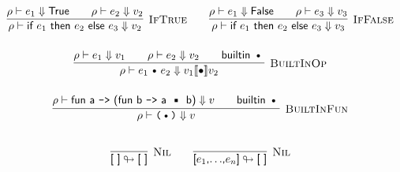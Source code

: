 \documentclass{article}
\def\code#1{\textsf{#1}}
\def\rt{\Downarrow}
\def\binop{\, \text{\textbullet}\, }
\def\envj#1#2#3{#1 \vdash #2 \rt #3}
\def\tsc#1{\textsc{#1}}
\begin{document}
\begin{gather*}
\infer[\tsc{IfTrue}]{\envj \rho {\code{if $e_1$ then $e_2$ else $e_3$}} {v_2}}{\envj \rho {e_1} {\code{True}} && \envj \rho {e_2} {v_2}}\qquad
\infer[\tsc{IfFalse}]{\envj \rho {\code{if $e_1$ then $e_2$ else $e_3$}} {v_3}}{\envj \rho {e_1} {\code{False}} && \envj \rho {e_3} {v_3}}
\\[12pt]
\infer[\tsc{BuiltInOp}]{\envj \rho {e_1 \binop e_2} {v_1\llbracket\bullet \rrbracket v_2}}{\envj \rho {e_1} {v_1} && \envj {\rho} {e_2} {v_2} && \textsf{builtin}\, \binop}\\[12pt]
\infer[\tsc{BuiltInFun}]{\envj \rho {\texttt{($\binop$)}} {v}}{\envj \rho {\code{fun a \texttt{->} (fun b \texttt{->} a $\binop$ b)}} {v} && \textsf{builtin}\, \binop}\\[12pt]
\end{gather*}



\begin{gather*}
\infer[\tsc{Nil}]{\code{[ ]}\looparrowright \code{[ ]}}{}\qquad
\infer[\tsc{Nil}]{\code{[$e_1$,$\ldots$,$e_n$]}\looparrowright \code{[ ]}}{}
\end{gather*}
\end{document}
